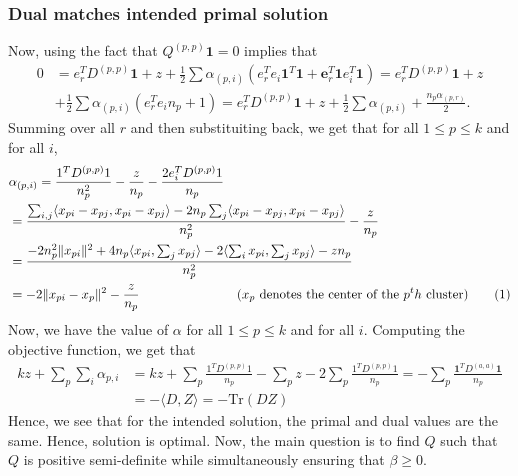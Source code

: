 \documentclass[12pt]{article}
\newcommand{\mb}{\mathbf}
\newcommand{\tr}{\text{Tr}}
\newcommand\numberthis{\addtocounter{equation}{1}\tag{\theequation}}
\begin{document}
\subsubsection*{Dual matches intended primal solution}
Now, using the fact that $Q^{(p, p)}\mb 1 = 0$ implies that
\begin{align*}
  0 &= e_r^TD^{(p,p)}\mb1 + z + \frac{1}{2}\sum\alpha_{(p,i)} (e_r^Te_{i}\mb 1^T\mb1 + \mb e_r^T\mb1e_{i}^T\mb1) = e_r^TD^{(p,p)}\mb1 + z\\
  & + \frac{1}{2}\sum\alpha_{(p,i)} (e_r^Te_{i}n_p + 1) = e_r^TD^{(p,p)}\mb1 + z + \frac{1}{2}\sum\alpha_{(p,i)} +\frac{n_p\alpha_{(p,r)}}{2}.
\end{align*}
Summing over all $r$ and then substituiting back, we get that for all $1\le p \le k$ and for all $i$,  
\begin{align*}
  &\alpha_{(p, i)} = \frac{1^TD^{(p,p)}1}{n_p^2}-\frac{z}{n_p} -\frac{2e_i^TD^{(p,p)}1}{n_p}\\
  & = \frac{\sum_{i,j}\langle x_{pi}-x_{pj}, x_{pi}-x_{pj}\rangle -2n_p \sum_j\langle x_{pi}-x_{pj}, x_{pi}-x_{pj}\rangle}{n_p^2}-\frac{z}{n_p}\\
  &= \frac{-2n_p^2 \|x_{pi}\|^2 + 4n_p \langle x_{pi}, \sum_jx_{pj}\rangle - 2\langle \sum_i x_{pi}, \sum_j x_{pj}\rangle -zn_p}{n_p^2}\\
  &= -2\|x_{pi} - x_p\|^2-\frac{z}{n_p} \hspace{1in}\text{ ($x_p$ denotes the center of the $p^th$ cluster)}\numberthis \label{a-eqn:alphapi}
\end{align*}
Now, we have the value of $\alpha$ for all $1\le p \le k$ and for all $i$. Computing the objective function, we get that 
\begin{align*}
  kz + \sum_p\sum_i \alpha_{p,i} &= kz + \sum_{p}\frac{1^TD^{(p, p)}1}{n_p} - \sum_p z -2\sum_p \frac{1^TD^{(p,p)}1}{n_p} = -\sum_p \frac{\mb1^TD^{(a,a)}\mb1}{n_p}\\
  & = -\langle D, Z \rangle = -\tr(DZ)
\end{align*}
Hence, we see that for the intended solution, the primal and dual values are the same. Hence, solution is optimal. Now, the main question is to find $Q$ such that $Q$ is positive semi-definite while simultaneously ensuring that $\beta \ge 0$.  
\end{document}
